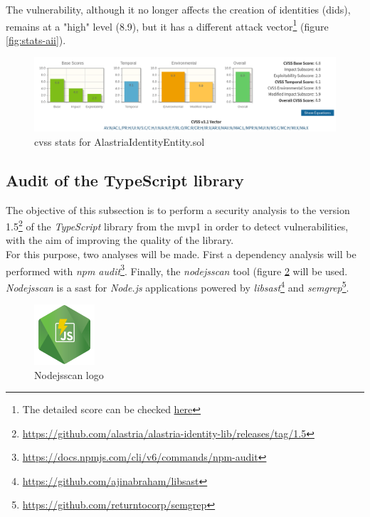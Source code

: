 \documentclass[a4paper, 12pt]{article} %
\begin{document}
            The vulnerability, although it no longer affects the creation of identities (\acrshort{did}s), remains at a "high" level (8.9), but it has a different attack vector\footnote{The detailed score can be checked \href{https://nvd.nist.gov/vuln-metrics/cvss/v3-calculator?vector=AV:N/AC:L/PR:H/UI:N/S:C/C:H/I:N/A:N/E:F/RL:O/RC:R/CR:H/IR:X/AR:X/MAV:N/MAC:L/MPR:N/MUI:N/MS:C/MC:H/MI:X/MA:X&version=3.1}{here}} (figure \ref{fig:stats-aii}).\\
            \begin{figure}[h]
                \centering
                \includegraphics[width=1.1\textwidth]{stats-aie.png}
                \caption{\acrshort{cvss} stats for AlastriaIdentityEntity.sol}
                \label{fig:stats-aie}
            \end{figure}
        \subsection{Audit of the TypeScript library}
            The objective of this subsection is to perform a security analysis to the version 1.5\footnote{\url{https://github.com/alastria/alastria-identity-lib/releases/tag/1.5}\label{lib-version}} of the \textit{TypeScript} library from the \acrshort{mvp}1 in order to detect vulnerabilities, with the aim of improving the quality of the library.\\ 
            
            For this purpose, two analyses will be made. First a dependency analysis will be performed with \textit{\acrshort{npm} audit}\footnote{\url{https://docs.npmjs.com/cli/v6/commands/npm-audit}}. Finally, the \textit{nodejsscan} tool (figure \ref{fig:nodejsscan-logo} will be used. \textit{Nodejsscan} is a \acrfull{sast} for \textit{Node.js} applications powered by \textit{libsast}\footnote{\url{https://github.com/ajinabraham/libsast}} and \textit{semgrep}\footnote{\url{https://github.com/returntocorp/semgrep}}.
            \begin{figure}[h]
                \centering
                \includegraphics[width=0.2\textwidth]{nodejsscan-logo.png}
                \caption{Nodejsscan logo}
                \label{fig:nodejsscan-logo}
            \end{figure}
            
\end{document}
